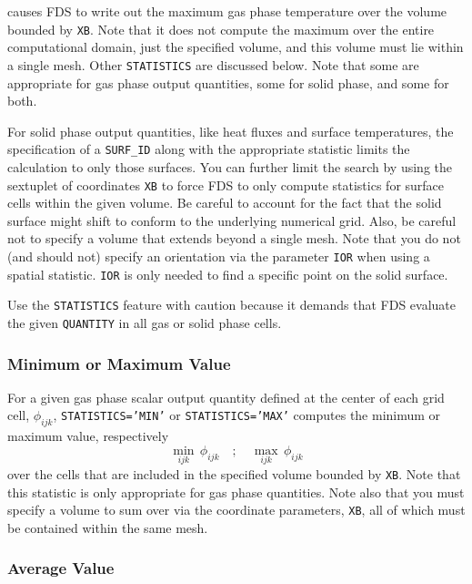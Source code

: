 \documentclass[11pt]{book}
\newcommand{\ct}{\tt\small}
\newcommand{\be}{\begin{equation}}
\newcommand{\ee}{\end{equation}}
\begin{document}
\noindent
causes FDS to write out the maximum gas phase temperature over the volume bounded by {\ct XB}. Note that it
does not compute the maximum over the entire computational domain, just the specified volume, and this volume must lie within a single mesh.
Other {\ct STATISTICS} are discussed below.  Note that some are appropriate for gas phase output quantities, some for solid phase,
and some for both.

For solid phase output quantities, like heat fluxes and surface temperatures, the
specification of a {\ct SURF\_ID} along with the appropriate statistic limits the calculation to only those surfaces. You can further limit the search by using the
sextuplet of coordinates {\ct XB} to force FDS to only compute statistics for surface cells within the given volume. Be careful to
account for the fact that the solid surface might shift to conform to the underlying numerical grid. Also, be careful not to specify a
volume that extends beyond a single mesh. Note that you do not (and should not) specify an orientation via the parameter {\ct IOR} when using
a spatial statistic. {\ct IOR} is only needed to find a specific point on the solid surface.

\begin{warning}
\noindent
Use the {\ct STATISTICS} feature with caution because
it demands that FDS evaluate the given {\ct QUANTITY} in all gas or solid phase cells.
\end{warning}

\subsubsection{Minimum or Maximum Value}

For a given gas phase scalar output quantity defined at the center of each grid cell, $\phi_{ijk}$, {\ct STATISTICS='MIN'} or {\ct STATISTICS='MAX'}
computes the minimum or maximum value, respectively
\be \min_{ijk} \, \phi_{ijk} \quad ; \quad  \max_{ijk} \, \phi_{ijk} \ee
over the cells that are included in the specified volume bounded by {\ct XB}. Note that this
statistic is only appropriate for gas phase quantities. Note also that you must specify a volume to sum over via the
coordinate parameters, {\ct XB}, all of which must be contained within the same mesh.


\subsubsection{Average Value}
\end{document}
